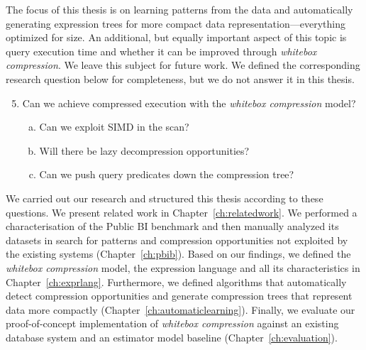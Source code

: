 The focus of this thesis is on learning patterns from the data and automatically generating expression trees for more compact data representation---everything optimized for size. An additional, but equally important aspect of this topic is query execution time and whether it can be improved through \textit{whitebox compression}. We leave this subject for future work. We defined the corresponding research question below for completeness, but we do not answer it in this thesis. 
\begin{enumerate}[1)]
    \setcounter{enumi}{4}
    \item Can we achieve compressed execution with the \textit{whitebox compression} model?
    \begin{enumerate}[a)]
        \item Can we exploit SIMD in the scan?
        \item Will there be lazy decompression opportunities?
        \item Can we push query predicates down the compression tree?
    \end{enumerate}
\end{enumerate}

We carried out our research and structured this thesis according to these questions. We present related work in Chapter~\ref{ch:relatedwork}. We performed a characterisation of the Public BI benchmark and then manually analyzed its datasets in search for patterns and compression opportunities not exploited by the existing systems (Chapter~\ref{ch:pbib}). Based on our findings, we defined the \textit{whitebox compression} model, the expression language and all its characteristics in Chapter~\ref{ch:exprlang}. Furthermore, we defined algorithms that automatically detect compression opportunities and generate compression trees that represent data more compactly (Chapter~\ref{ch:automaticlearning}). Finally, we evaluate our proof-of-concept implementation of \textit{whitebox compression} against an existing database system and an estimator model baseline (Chapter~\ref{ch:evaluation}).
